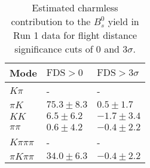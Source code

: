 \begin{table}[h]
  \centering
  \begin{tabular}{lll}
      \toprule
      Mode & $\mathrm{FDS} > 0$ & $\mathrm{FDS} > 3\sigma$ \\
      \midrule
      $K\pi$ & \-- & \-- \\
      $\pi K$ & $75.3 \pm 8.3$ & $0.5 \pm 1.7$ \\
      $KK$ & $6.5 \pm 6.2$ & $-1.7 \pm 3.4$ \\
      $\pi\pi$ & $0.6 \pm 4.2$ & $-0.4 \pm 2.2$ \\
      $K\pi\pi\pi$ & \-- & \-- \\
      $\pi K\pi\pi$ & $34.0 \pm 6.3$ & $-0.4 \pm 2.2$ \\
      \bottomrule
  \end{tabular}
  \caption{\small Estimated charmless contribution to the $B^{0}_{s}$ yield in Run 1 data for flight distance significance cuts of 0  and $3\sigma$.}
\label{tab:charmless_yields_Bs_run_1}
\end{table}
